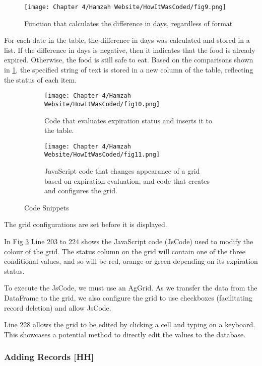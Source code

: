 \begin{figure}[H]        
    \centering
    \texttt{[image: Chapter 4/Hamzah Website/HowItWasCoded/fig9.png]}
    \caption{Function that calculates the difference in days, regardless of format}
\end{figure} 

For each date in the table, the difference in days was calculated and stored in a list.
If the difference in days is negative, then it indicates that the food is already expired.
Otherwise, the food is still safe to eat.
Based on the comparisons shown in \ref{fig:awefulcode}, the specified string of text is stored in a new column of the table, reflecting the status of each item.


\begin{figure}[H]
    \begin{subfigure}{.5\textwidth}
        \centering
        \texttt{[image: Chapter 4/Hamzah Website/HowItWasCoded/fig10.png]}
        \caption{Code that evaluates expiration status and inserts it to the table.}
        \label{fig:awefulcode}
    \end{subfigure}%
    \begin{subfigure}{.5\textwidth}
        \centering
        \texttt{[image: Chapter 4/Hamzah Website/HowItWasCoded/fig11.png]}
        \caption{JavaScript code that changes appearance of a grid based on expiration evaluation, and code that creates and configures the grid.}
        \label{fig:badcode}
    \end{subfigure}
    \caption{Code Snippets}
\end{figure}

The grid configurations are set before it is displayed.

In Fig \ref{fig:badcode} Line 203 to 224 shows the JavaScript code (JsCode) used to modify the colour of the grid.
The status column on the grid will contain one of the three conditional values, and so will be red, orange or green depending on its expiration status.

To execute the JsCode, we must use an AgGrid.
As we transfer the data from the DataFrame to the grid, we also configure the grid to use checkboxes (facilitating record deletion) and allow JsCode.

Line 228 allows the grid to be edited by clicking a cell and typing on a keyboard.
This showcases a potential method to directly edit the values to the database.

\subsubsection{Adding Records [HH]}


